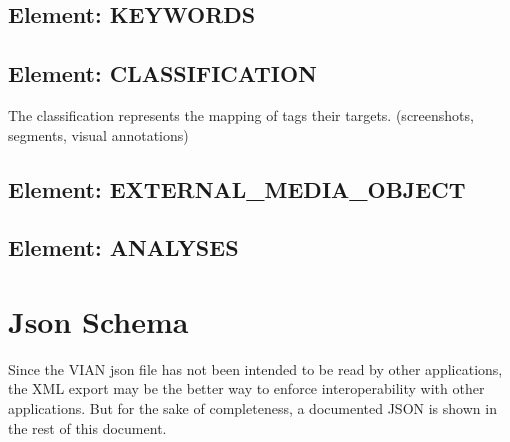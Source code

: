 \documentclass[11pt, a4paper,oneside,chapterprefix=false]{scrbook}
\begin{document}
\subsection{Element: KEYWORDS}


\subsection{Element: CLASSIFICATION}
The classification represents the mapping of tags their targets. (screenshots, segments, visual annotations) 

\newpage

\subsection{Element: EXTERNAL\_MEDIA\_OBJECT}


\subsection{Element: ANALYSES}



\newpage
\section{Json Schema}
Since the VIAN json file has not been intended to be read by other applications, the XML export may be the better way to enforce interoperability with other applications. But for the sake of completeness, a documented JSON is shown in the rest of this document. 

\end{document}

